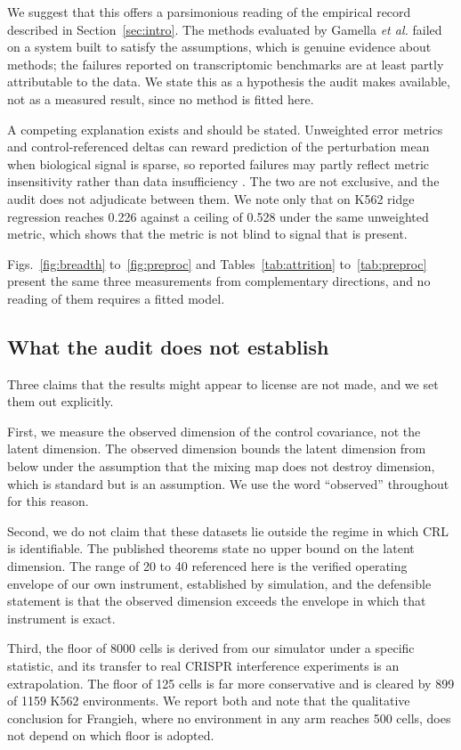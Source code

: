 \documentclass[journal,twoside,web]{ieeecolor}
\begin{document}
We suggest that this offers a parsimonious reading of the empirical record
described in Section~\ref{sec:intro}. The methods evaluated by Gamella
\emph{et al.} \cite{gamella2025} failed on a system built to satisfy the
assumptions, which is genuine evidence about methods; the failures reported on
transcriptomic benchmarks \cite{ahlmann2025,vollenweider2026,vinas2026} are at
least partly attributable to the data. We state this as a hypothesis the audit
makes available, not as a measured result, since no method is fitted here.

A competing explanation exists and should be stated. Unweighted error metrics
and control-referenced deltas can reward prediction of the perturbation mean
when biological signal is sparse, so reported failures may partly reflect
metric insensitivity rather than data insufficiency \cite{vollenweider2026}.
The two are not exclusive, and the audit does not adjudicate between them. We
note only that on K562 ridge regression reaches 0.226 against a ceiling of
0.528 under the same unweighted metric, which shows that the metric is not
blind to signal that is present.

Figs.~\ref{fig:breadth} to~\ref{fig:preproc} and
Tables~\ref{tab:attrition} to~\ref{tab:preproc} present the same three
measurements from complementary directions, and no reading of them requires a
fitted model.

\subsection{What the audit does not establish}
Three claims that the results might appear to license are not made, and we set
them out explicitly.

First, we measure the observed dimension of the control covariance, not the
latent dimension. The observed dimension bounds the latent dimension from
below under the assumption that the mixing map does not destroy dimension,
which is standard but is an assumption. We use the word ``observed''
throughout for this reason.

Second, we do not claim that these datasets lie outside the regime in which
CRL is identifiable. The published theorems state no upper bound on the latent
dimension. The range of 20 to 40 referenced here is the verified operating
envelope of our own instrument, established by simulation, and the defensible
statement is that the observed dimension exceeds the envelope in which that
instrument is exact.

Third, the floor of 8000 cells is derived from our simulator under a specific
statistic, and its transfer to real CRISPR interference experiments is an
extrapolation. The floor of 125 cells is far more conservative and is cleared
by 899 of 1159 K562 environments. We report both and note that the qualitative
conclusion for Frangieh, where no environment in any arm reaches 500 cells,
does not depend on which floor is adopted.
\end{document}
